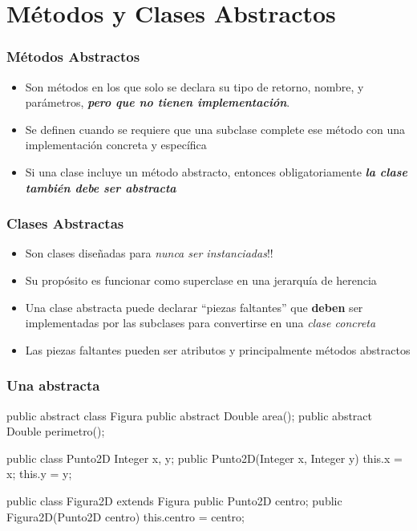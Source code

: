 \documentclass{beamer}
\begin{document}
\section{Métodos y Clases Abstractos}

\begin{frame}
  \frametitle{Métodos Abstractos}

  \begin{itemize}
  \item Son métodos en los que solo se declara su tipo de retorno,
    nombre, y parámetros, \textbf{\textit{pero que no tienen
        implementación}}.
    
  \item Se definen cuando se requiere que una subclase complete ese
    método con una implementación concreta y específica
    
  \item Si una clase incluye un método abstracto, entonces
    obligatoriamente \textbf{\textit{la clase también debe ser
        abstracta}}
    
  \end{itemize}
  
\end{frame}

\begin{frame}
  \frametitle{Clases Abstractas}

  \begin{itemize}
  \item Son clases diseñadas para \emph{nunca ser instanciadas}!!
    
  \item Su propósito es funcionar como superclase en una jerarquía de
    herencia
    
  \item Una clase abstracta puede declarar ``piezas faltantes'' que
    \textbf{deben} ser implementadas por las subclases para
    convertirse en una \emph{clase concreta}
    
  \item Las piezas faltantes pueden ser atributos y principalmente
    métodos abstractos    
  \end{itemize}
\end{frame}

\begin{frame}[fragile]
  \frametitle{Una  abstracta}

  \begin{jsmall}
    public abstract class Figura {
      public abstract Double area();
      public abstract Double perimetro();
    }

    public class Punto2D {
      Integer x, y;
      public Punto2D(Integer x, Integer y) {
        this.x = x;
        this.y = y;
      }      
    }

    public class Figura2D extends Figura {
      public Punto2D centro;
      public Figura2D(Punto2D centro) {
        this.centro = centro;
      }
    }
  \end{jsmall}
\end{frame}
\end{document}
